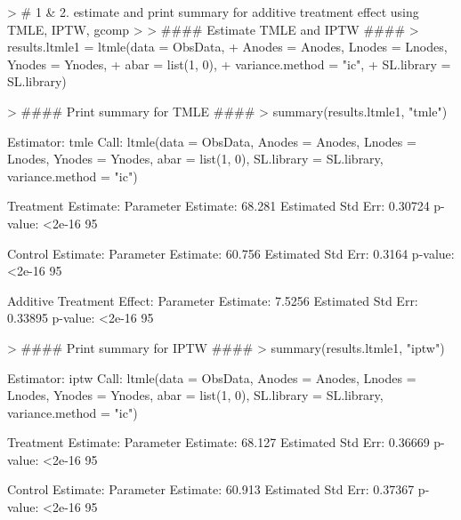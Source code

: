 \documentclass[answers]{exam}
\begin{document}
\begin{solution}
\begin{Schunk}
\begin{Sinput}
> # 1 & 2. estimate and print summary for additive treatment effect using TMLE, IPTW, gcomp
> 
> #### Estimate TMLE and IPTW ####
> results.ltmle1 = ltmle(data = ObsData, 
+                        Anodes = Anodes, Lnodes = Lnodes, Ynodes = Ynodes, 
+                        abar = list(1, 0),
+                        variance.method = "ic",
+                        SL.library = SL.library)
\end{Sinput}
\end{Schunk}
\begin{Schunk}
\begin{Sinput}
> #### Print summary for TMLE ####
> summary(results.ltmle1, "tmle")
\end{Sinput}
\begin{Soutput}
Estimator:  tmle 
Call:
ltmle(data = ObsData, Anodes = Anodes, Lnodes = Lnodes, Ynodes = Ynodes, 
    abar = list(1, 0), SL.library = SL.library, variance.method = "ic")

Treatment Estimate:
   Parameter Estimate:  68.281 
    Estimated Std Err:  0.30724 
              p-value:  <2e-16 
    95%

Control Estimate:
   Parameter Estimate:  60.756 
    Estimated Std Err:  0.3164 
              p-value:  <2e-16 
    95%

Additive Treatment Effect:
   Parameter Estimate:  7.5256 
    Estimated Std Err:  0.33895 
              p-value:  <2e-16 
    95%
\end{Soutput}
\end{Schunk}
\begin{Schunk}
\begin{Sinput}
> #### Print summary for IPTW ####
> summary(results.ltmle1, "iptw")
\end{Sinput}
\begin{Soutput}
Estimator:  iptw 
Call:
ltmle(data = ObsData, Anodes = Anodes, Lnodes = Lnodes, Ynodes = Ynodes, 
    abar = list(1, 0), SL.library = SL.library, variance.method = "ic")

Treatment Estimate:
   Parameter Estimate:  68.127 
    Estimated Std Err:  0.36669 
              p-value:  <2e-16 
    95%

Control Estimate:
   Parameter Estimate:  60.913 
    Estimated Std Err:  0.37367 
              p-value:  <2e-16 
    95%


\end{Soutput}
\end{Schunk}
\end{solution}
\end{document}

